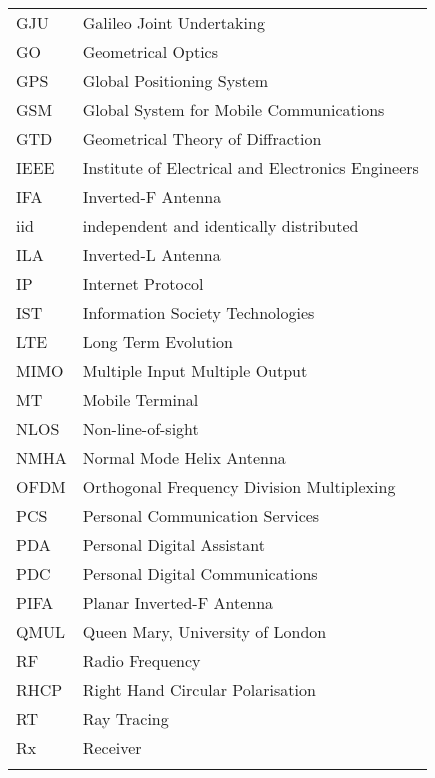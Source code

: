 \begin{tabular}{ll}
\\

GJU & Galileo Joint Undertaking\\

GO & Geometrical Optics\\

GPS & Global Positioning System \\

GSM & Global System for Mobile Communications\\

GTD & Geometrical Theory of Diffraction\\

IEEE & Institute of Electrical and Electronics Engineers\\

IFA & Inverted-F Antenna\\

iid & independent and identically distributed\\

ILA & Inverted-L Antenna\\

IP & Internet Protocol\\

IST & Information Society Technologies\\

LTE & Long Term Evolution\\

MIMO & Multiple Input Multiple Output\\

MT & Mobile Terminal\\

NLOS & Non-line-of-sight\\

NMHA & Normal Mode Helix Antenna\\

OFDM & Orthogonal Frequency Division Multiplexing\\

PCS  & Personal Communication Services\\

PDA & Personal Digital Assistant\\

PDC & Personal Digital Communications\\

PIFA & Planar Inverted-F Antenna\\

QMUL & Queen Mary, University of London\\

RF & Radio Frequency\\

RHCP & Right Hand Circular Polarisation\\

RT & Ray Tracing\\

Rx & Receiver \\






\\
\end{tabular}

